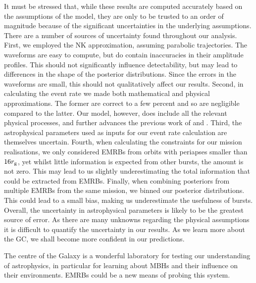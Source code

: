 It must be stressed that, while these results are computed accurately based on the assumptions of the model, they are only to be trusted to an order of magnitude because of the significant uncertainties in the underlying assumptions. There are a number of sources of uncertainty found throughout our analysis. First, we employed the NK approximation, assuming parabolic trajectories. The waveforms are easy to compute, but do contain inaccuracies in their amplitude profiles. This should not significantly influence detectability, but may lead to differences in the shape of the posterior distributions. Since the errors in the waveforms are small, this should not qualitatively affect our results. Second, in calculating the event rate we made both mathematical and physical approximations. The former are correct to a few percent and so are negligible compared to the latter. Our model, however, does include all the relevant physical processes, and further advances the previous work of \citet{Rubbo2006} and \citet{Hopman2007}. Third, the astrophysical parameters used as inputs for our event rate calculation are themselves uncertain. Fourth, when calculating the constraints for our mission realisations, we only considered EMRBs from orbits with periapses smaller than $16 r_\mathrm{g}$, yet whilst little information is expected from other bursts, the amount is not zero. This may lead to us slightly underestimating the total information that could be extracted from EMRBs. Finally, when combining posteriors from multiple EMRBs from the same mission, we binned our posterior distributions. This could lead to a small bias, making us underestimate the usefulness of bursts. Overall, the uncertainty in astrophysical parameters is likely to be the greatest source of error. As there are many unknowns regarding the physical assumptions it is difficult to quantify the uncertainty in our results. As we learn more about the GC, we shall become more confident in our predictions.

The centre of the Galaxy is a wonderful laboratory for testing our understanding of astrophysics, in particular for learning about MBHs and their influence on their environments. EMRBs could be a new means of probing this system.
